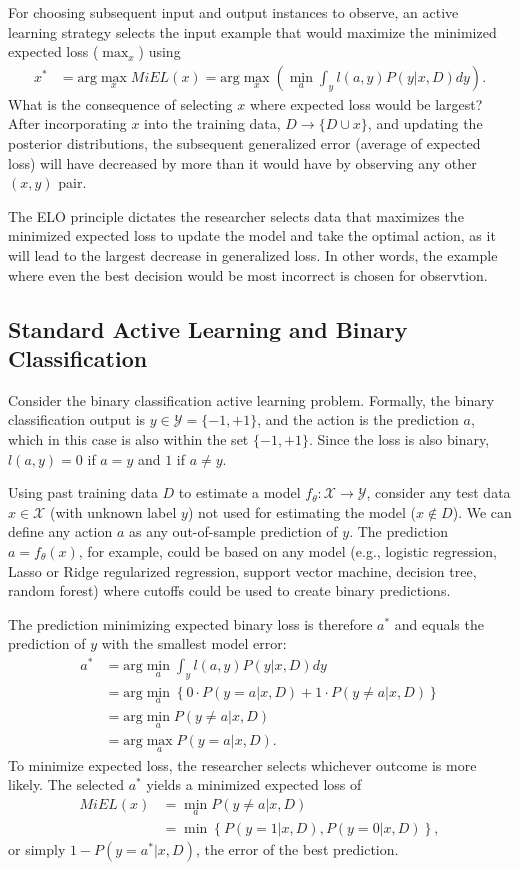 \documentclass[nonblindrev]{informs3}
\begin{document}
For choosing subsequent input and output instances to observe, an active learning strategy selects the input example that would maximize the minimized expected loss ($\max_x$) using 
\begin{align}
x^{*}  &= \text{arg}\max_x MiEL(x) = \text{arg}\max_{x} \left( \min_{a} \int_y l(a,y) P(y|x,D) dy \right).
\end{align}
What is the consequence of selecting $x$ where expected loss would be largest? After incorporating $x$ into the training data, $D \to \{D \cup x \}$, and updating the posterior distributions, the subsequent generalized error (average of expected loss) will have decreased by more than it would have by observing any other $(x,y)$ pair.

The ELO principle dictates the researcher selects data that maximizes the minimized expected loss  to update the model and take the optimal action, as it will lead to the largest decrease in generalized loss. In other words, the example where even the best decision would be most incorrect is chosen for observtion. 

\subsection{Standard Active Learning and Binary Classification}

Consider the binary classification active learning problem. Formally, the binary classification output is $y \in \mathcal{Y} = \{-1,+1\}$, and the action is the prediction $a$, which in this case is also within the set $\{-1,+1\}$. Since the loss is also binary, $l(a,y)=0$ if $a=y$ and $1$ if $a \neq y$. 

Using past training data $D$ to estimate a model $f_\theta: \mathcal{X} \to \mathcal{Y}$, consider any test data $x \in \mathcal{X}$ (with unknown label $y$) not used for estimating the model ($x \notin D$). We can define any action $a$ as any out-of-sample prediction of $y$. The prediction $a=f_\theta(x)$, for example, could be based on any model (e.g., logistic regression, Lasso or Ridge regularized regression, support vector machine, decision tree, random forest) where cutoffs could be used to create binary predictions. 

The prediction minimizing expected binary loss is therefore $a^{*}$ and equals the prediction of $y$ with the smallest model error:
\begin{align}
a^{*} &= \text{arg} \min_{a} \int_y l(a,y) P(y|x,D) dy  \\
& = \text{arg} \min_{a} \left\{ 0 \cdot P(y=a|x,D) + 1 \cdot P(y \neq a|x,D) \right\}  \\
&= \text{arg} \min_{a} P(y \neq a|x,D) \\
&= \text{arg} \max_{a} P(y = a|x,D) .
\end{align}
To minimize expected loss, the researcher selects whichever outcome is more likely. The selected $a^{*}$ yields a minimized expected loss of
\begin{align}
 MiEL(x) &= \min_{a} P(y \neq a|x,D) \\
 &= \min \left\{ P(y=1|x,D), P(y=0|x,D) \right\},
\end{align}
or simply $1 - P(y = a^{*}|x,D)$, the error of the best prediction. 
\end{document}
